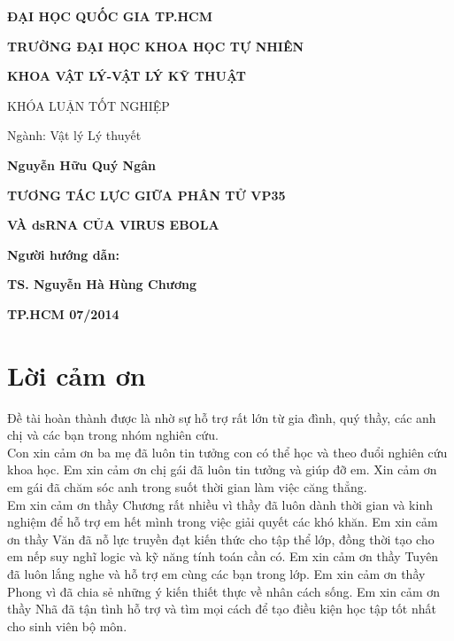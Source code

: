\documentclass[12pt,a4paper,reqno, oneside]{book}
\begin{document}
\newpage
\begin{titlepage}
\centerline{\bf ĐẠI HỌC QUỐC GIA TP.HCM}
\centerline{\bf TRƯỜNG ĐẠI HỌC KHOA HỌC TỰ NHIÊN}
\centerline{\bf KHOA VẬT LÝ-VẬT LÝ KỸ THUẬT}
\vspace*{1cm}
\centerline{KHÓA LUẬN TỐT NGHIỆP}
\centerline{Ngành: Vật lý Lý thuyết}
\vspace*{1cm}
\centerline{\bf Nguyễn Hữu Quý Ngân}
\vspace*{3cm}
\centerline{\Large\bf TƯƠNG TÁC LỰC GIỮA PHÂN TỬ VP35}
\vspace*{0.5cm}
\centerline{\Large\bf VÀ dsRNA CỦA VIRUS EBOLA}
\vspace*{4cm}
\centerline{\bf Người hướng dẫn: }
\centerline{\bf TS. Nguyễn Hà Hùng Chương}
\vfill
\centerline{\bf TP.HCM 07/2014}
\end{titlepage}

\pagestyle{plain}
%

\cleardoublepage%
\pagestyle{fancy}
\tableofcontents
\clearpage

\newpage
{}
\chapter*{Lời cảm ơn}
Đề tài hoàn thành được là nhờ sự hỗ trợ rất lớn từ gia đình, quý thầy, các anh chị và các bạn trong nhóm nghiên cứu.\\

Con xin cảm ơn ba mẹ đã luôn tin tưởng con có thể học và theo đuổi nghiên cứu khoa học. Em xin cảm ơn chị gái đã luôn tin tưởng và giúp đỡ em. Xin cảm ơn em gái đã chăm sóc anh trong suốt thời gian làm việc căng thẳng.\\

Em xin cảm ơn thầy Chương rất nhiều vì thầy đã luôn dành thời gian và kinh nghiệm để hỗ trợ em hết mình trong việc giải quyết các khó khăn. Em xin cảm ơn thầy Văn đã nỗ lực truyền đạt kiến thức cho tập thể lớp, đồng thời tạo cho em nếp suy nghĩ logic và kỹ năng tính toán cần có. Em xin cảm ơn thầy Tuyên đã luôn lắng nghe và hỗ trợ em cùng các bạn trong lớp. Em xin cảm ơn thầy Phong vì đã chia sẻ những ý kiến thiết thực về nhân cách sống. Em xin cảm ơn thầy Nhã đã tận tình hỗ trợ và tìm mọi cách để tạo điều kiện học tập tốt nhất cho sinh viên bộ môn.\\
\end{document}
